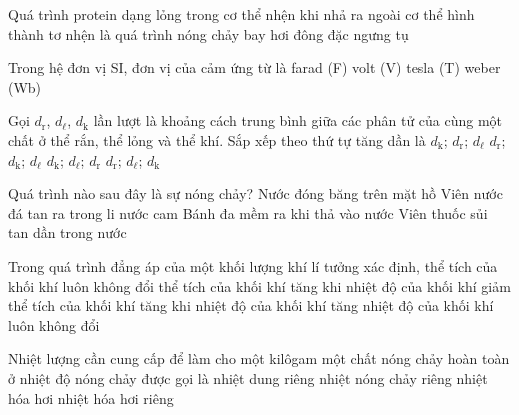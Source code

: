 	\begin{ex}%
		Quá trình protein dạng lỏng trong cơ thể nhện khi nhả ra ngoài cơ thể hình thành tơ nhện là quá trình
		\choice
		{nóng chảy}
		{bay hơi}
		{\True đông đặc}
		{ngưng tụ}
	\end{ex}

	\begin{ex}%
		Trong hệ đơn vị SI, đơn vị của cảm ứng từ là
		\choice
		{farad (F)}
		{volt (V)}
		{\True tesla (T)}
		{weber (Wb)}
	\end{ex}

	\begin{ex}%
		Gọi $d_\text{r}$, $d_\ell$, $d_\text{k}$ lần lượt là khoảng cách trung bình giữa các phân tử của cùng một chất ở thể rắn, thể lỏng và thể khí. Sắp xếp theo thứ tự tăng dần là
		\choice
		{$d_\text{k}$; $d_\text{r}$; $d_\ell$}
		{$d_\text{r}$; $d_\text{k}$; $d_\ell$}
		{$d_\text{k}$; $d_\ell$; $d_\text{r}$}
		{\True $d_\text{r}$; $d_\ell$; $d_\text{k}$}
	\end{ex}

	\begin{ex}%
		Quá trình nào sau đây là sự nóng chảy?
		\choice
		{Nước đóng băng trên mặt hồ}
		{\True Viên nước đá tan ra trong li nước cam}
		{Bánh đa mềm ra khi thả vào nước}
		{Viên thuốc sủi tan dần trong nước}
	\end{ex}

	\begin{ex}%
		Trong quá trình đẳng áp của một khối lượng khí lí tưởng xác định,
		\choice
		{thể tích của khối khí luôn không đổi}
		{thể tích của khối khí tăng khi nhiệt độ của khối khí giảm}
		{\True thể tích của khối khí tăng khi nhiệt độ của khối khí tăng}
		{nhiệt độ của khối khí luôn không đổi}
	\end{ex}

	\begin{ex}%
		Nhiệt lượng cần cung cấp để làm cho một kilôgam một chất nóng chảy hoàn toàn ở nhiệt độ nóng chảy được gọi là
		\choice
		{nhiệt dung riêng}
		{\True nhiệt nóng chảy riêng}
		{nhiệt hóa hơi}
		{nhiệt hóa hơi riêng}
	\end{ex}

